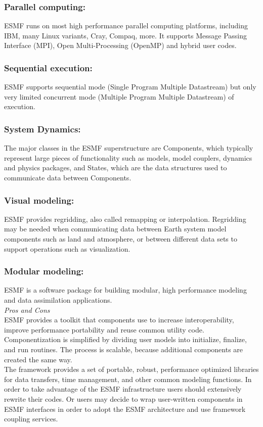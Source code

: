\subsubsection{Parallel computing:}
ESMF runs on most high performance parallel computing platforms, including IBM, many Linux variants, Cray, Compaq, more. It supports Message Passing Interface (MPI), Open Multi-Processing (OpenMP) and hybrid user codes.
\subsubsection{Sequential execution:}
ESMF supports sequential mode (Single Program Multiple Datastream) but only very limited concurrent mode (Multiple Program Multiple Datastream) of execution.
\subsubsection{System Dynamics:}
The major classes in the ESMF superstructure are Components, which typically represent large pieces of functionality such as models, model couplers, dynamics and physics packages, and States, which are the data structures used to communicate data between Components.
\subsubsection{Visual modeling:}
ESMF provides regridding, also called remapping or interpolation. Regridding may be needed when communicating data between Earth system model components such as land and atmosphere, or between different data sets to support operations such as visualization.
\subsubsection{Modular modeling:}
ESMF is a software package for building modular, high performance modeling and data assimilation applications.\\

\emph{Pros and Cons}\\
ESMF provides a toolkit that components use to increase interoperability, improve performance portability and reuse common utility code. Componentization is simplified by dividing user models into initialize, finalize, and run routines. The process is scalable, because additional components are created the same way.\\
The framework provides a set of portable, robust, performance optimized libraries for data transfers, time management, and other common modeling functions. In order to take advantage of the ESMF infrastructure users should extensively rewrite their codes. Or users may decide to wrap user-written components in ESMF interfaces in order to adopt the ESMF architecture and use framework coupling services.\\

